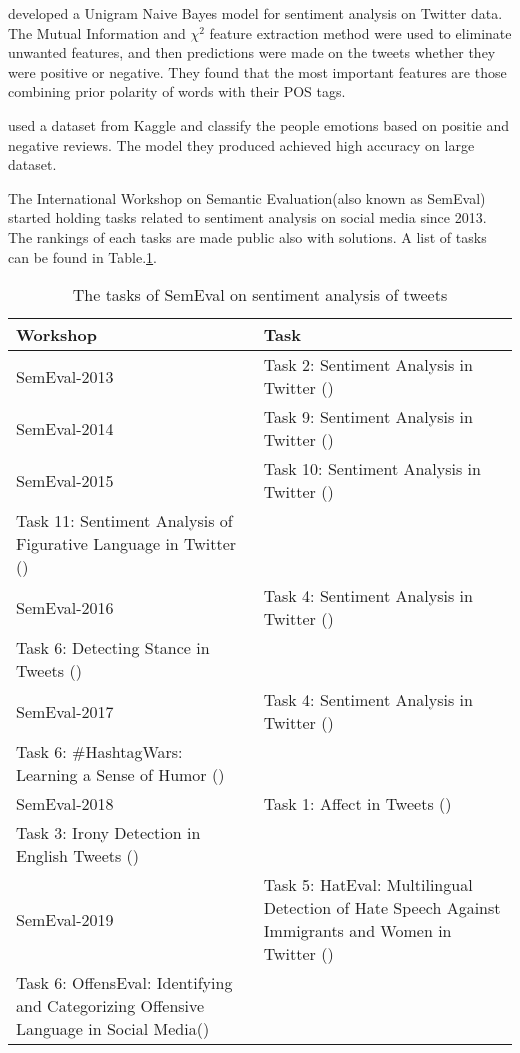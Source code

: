\cite{opinionMiningLiang2013} developed a Unigram Naive Bayes model for
sentiment analysis on Twitter data. The Mutual Information and $\chi^2$ feature
extraction method were used to eliminate unwanted features, and then predictions
were made on the tweets whether they were positive or negative. They found that
the most important features are those combining prior polarity of words with
their POS tags.

\cite{bhavsar2019sentiment} used a dataset from Kaggle and classify the people
emotions based on positie and negative reviews. The model they produced achieved
high accuracy on large dataset.

The International Workshop on Semantic Evaluation(also known as SemEval)
started holding tasks related to sentiment analysis on social media since 2013.
The rankings of each tasks are made public also with solutions. A list of tasks
can be found in Table.\ref{table:SemEvalTasks}. %

\begin{table}[b]
  \caption{The tasks of SemEval on sentiment analysis of tweets}
  \label{table:SemEvalTasks}
  \centering
  \renewcommand{\tabularxcolumn}{m} %
  \begin{tabularx}{\textwidth}{l >{\raggedright}X}
    \toprule
    \textbf{Workshop} & \textbf{Task}
    \tabularnewline \midrule
    SemEval-2013
    &
    Task 2: Sentiment Analysis in Twitter (\cite{SemEval2013Task2})
    \tabularnewline \hline
    SemEval-2014
    &
    Task 9: Sentiment Analysis in Twitter (\cite{SemEval2014Task9})
    \tabularnewline \hline
    SemEval-2015
    &
    Task 10: Sentiment Analysis in Twitter (\cite{SemEval2015Task10})\\
    Task 11: Sentiment Analysis of Figurative Language in Twitter
    (\cite{SemEval2015Task11})
    \tabularnewline \hline
    SemEval-2016
    &
    Task 4: Sentiment Analysis in Twitter (\cite{SemEval2016Task4})\\
    Task 6: Detecting Stance in Tweets (\cite{SemEval2016Task6})
    \tabularnewline \hline
    SemEval-2017
    &
    Task 4: Sentiment Analysis in Twitter ()\\
    Task 6: #HashtagWars: Learning a Sense of Humor ()
    \tabularnewline \hline
    SemEval-2018
    &
    Task 1: Affect in Tweets ()\\
    Task 3: Irony Detection in English Tweets ()
    \tabularnewline \hline
    SemEval-2019
    &
    Task 5: HatEval: Multilingual Detection of Hate Speech Against Immigrants
    and Women in Twitter ()\\
    Task 6: OffensEval: Identifying and Categorizing Offensive Language in
    Social Media()
    \tabularnewline \bottomrule
  \end{tabularx}
\end{table}
